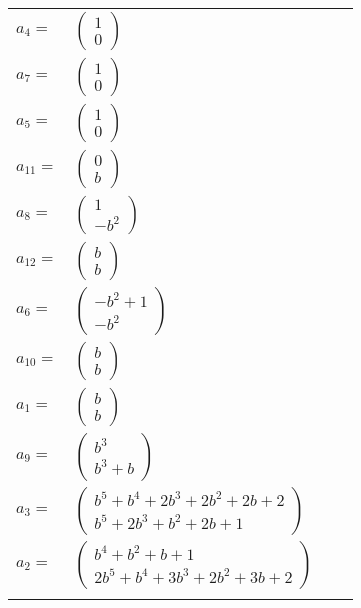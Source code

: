 \documentclass[1p]{elsarticle_modified}
\theoremstyle{definition}
\begin{document}
\begin{tabular}{m{7pt} m{180pt} m{7pt} m{180pt} }
\flushright $a_{4}=$&$\begin{pmatrix}1\\0\end{pmatrix}$ \\
\flushright $a_{7}=$&$\begin{pmatrix}1\\0\end{pmatrix}$ \\
\flushright $a_{5}=$&$\begin{pmatrix}1\\0\end{pmatrix}$ \\
\flushright $a_{11}=$&$\begin{pmatrix}0\\b\end{pmatrix}$ \\
\flushright $a_{8}=$&$\begin{pmatrix}1\\- b^2\end{pmatrix}$ \\
\flushright $a_{12}=$&$\begin{pmatrix}b\\b\end{pmatrix}$ \\
\flushright $a_{6}=$&$\begin{pmatrix}- b^2+1\\- b^2\end{pmatrix}$ \\
\flushright $a_{10}=$&$\begin{pmatrix}b\\b\end{pmatrix}$ \\
\flushright $a_{1}=$&$\begin{pmatrix}b\\b\end{pmatrix}$ \\
\flushright $a_{9}=$&$\begin{pmatrix}b^3\\b^3+b\end{pmatrix}$ \\
\flushright $a_{3}=$&$\begin{pmatrix}b^5+b^4+2 b^3+2 b^2+2 b+2\\b^5+2 b^3+b^2+2 b+1\end{pmatrix}$ \\
\flushright $a_{2}=$&$\begin{pmatrix}b^4+b^2+b+1\\2 b^5+b^4+3 b^3+2 b^2+3 b+2\end{pmatrix}$\\&\end{tabular}
\end{document}
